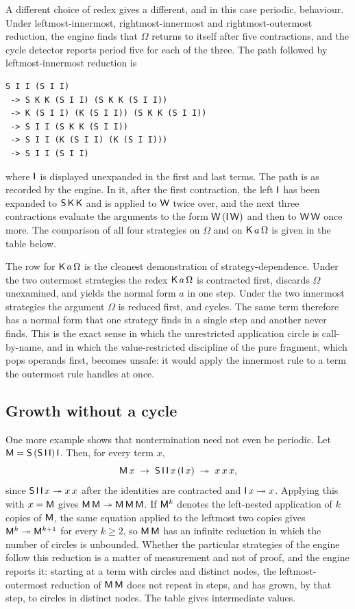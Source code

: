 A different choice of redex gives a different, and in this case periodic, behaviour. Under leftmost-innermost, rightmost-innermost and rightmost-outermost reduction, the engine finds that $\Omega$ returns to itself after five contractions, and the cycle detector reports period five for each of the three. The path followed by leftmost-innermost reduction is
\begin{lstlisting}
S I I (S I I)
 -> S K K (S I I) (S K K (S I I))
 -> K (S I I) (K (S I I)) (S K K (S I I))
 -> S I I (S K K (S I I))
 -> S I I (K (S I I) (K (S I I)))
 -> S I I (S I I)
\end{lstlisting}
where $\mathsf{I}$ is displayed unexpanded in the first and last terms. The path is as recorded by the engine. In it, after the first contraction, the left $\mathsf{I}$ has been expanded to $\mathsf{S}\,\mathsf{K}\,\mathsf{K}$ and is applied to $\mathsf{W}$ twice over, and the next three contractions evaluate the arguments to the form $\mathsf{W}\,(\mathsf{I}\,\mathsf{W})$ and then to $\mathsf{W}\,\mathsf{W}$ once more. The comparison of all four strategies on $\Omega$ and on $\mathsf{K}\,a\,\Omega$ is given in the table below.

\begin{center}
\tableStrategies
\end{center}

The row for $\mathsf{K}\,a\,\Omega$ is the cleanest demonstration of strategy-dependence. Under the two outermost strategies the redex $\mathsf{K}\,a\,\Omega$ is contracted first, discards $\Omega$ unexamined, and yields the normal form $a$ in one step. Under the two innermost strategies the argument $\Omega$ is reduced first, and cycles. The same term therefore has a normal form that one strategy finds in a single step and another never finds. This is the exact sense in which the unrestricted application circle is call-by-name, and in which the value-restricted discipline of the pure fragment, which pops operands first, becomes unsafe: it would apply the innermost rule to a term the outermost rule handles at once.

\subsection{Growth without a cycle}

One more example shows that nontermination need not even be periodic. Let $\mathsf{M}=\mathsf{S}\,(\mathsf{S}\,\mathsf{I}\,\mathsf{I})\,\mathsf{I}$. Then, for every term $x$,
\[
\mathsf{M}\,x\;\rightarrow\;\mathsf{S}\,\mathsf{I}\,\mathsf{I}\,x\,(\mathsf{I}\,x)\;\twoheadrightarrow\;x\,x\,x,
\]
since $\mathsf{S}\,\mathsf{I}\,\mathsf{I}\,x\twoheadrightarrow x\,x$ after the identities are contracted and $\mathsf{I}\,x\twoheadrightarrow x$. Applying this with $x=\mathsf{M}$ gives $\mathsf{M}\,\mathsf{M}\twoheadrightarrow\mathsf{M}\,\mathsf{M}\,\mathsf{M}$. If $\mathsf{M}^k$ denotes the left-nested application of $k$ copies of $\mathsf{M}$, the same equation applied to the leftmost two copies gives $\mathsf{M}^k\twoheadrightarrow\mathsf{M}^{k+1}$ for every $k\ge2$, so $\mathsf{M}\,\mathsf{M}$ has an infinite reduction in which the number of circles is unbounded. Whether the particular strategies of the engine follow this reduction is a matter of measurement and not of proof, and the engine reports it: starting at a term with \factMSizeStart{} circles and \factMDagStart{} distinct nodes, the leftmost-outermost reduction of $\mathsf{M}\,\mathsf{M}$ does not repeat in \factMStepEnd{} steps, and has grown, by that step, to \factMSizeEnd{} circles in \factMDagEnd{} distinct nodes. The table gives intermediate values.


